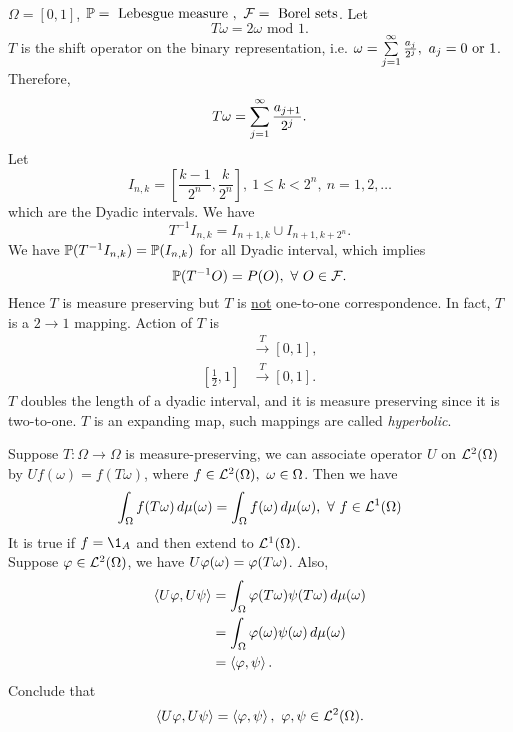 \begin{example}\ \\
$\Omega = [0,1]$, $\P = \text{ Lebesgue measure },\ \Fs = \text{ Borel sets}$. Let
\begin{equation*}
    T \omega = 2 \omega \text{ mod } 1.
\end{equation*}
$T$ is the shift operator on the binary representation, i.e. $\omega = \summ{j=1}\infty \frac{a_j}{2^j},\ a_j = 0 \text{ or } 1$. Therefore,
\begin{equation*}
    T \omega = \summ{j = 1}\infty \frac{a_{j + 1}}{2^j}.
\end{equation*}
Let
\begin{equation*}
    I_{n,k} = [\frac{k - 1}{2^n}, \frac{k}{2^n}],\ 1 \leq k < 2^n,\ n = 1,2,\dots
\end{equation*}
which are the Dyadic intervals. We have
\begin{equation*}
    T^{-1} I_{n,k} = I_{n+1,k} \cup I_{n+1, k+ 2^n}.
\end{equation*}
We have $\P(T^{-1} I_{n,k}) = \P(I_{n,k})$ for all Dyadic interval, which implies
\begin{equation*}
    \P(T^{-1} O) = P(O),\ \forall\ O \in \Fs.
\end{equation*}
Hence $T$ is measure preserving but $T$ is \underline{not} one-to-one correspondence. In fact, $T$ is a $2 \to 1$ mapping. Action of $T$ is
\begin{align*}
    [0,\frac{1}{2}] &\overset{T}{\to} [0,1],\\
    [\frac{1}{2},1] &\overset{T}{\to} [0,1].
\end{align*}
$T$ doubles the length of a dyadic interval, and it is measure preserving since it is two-to-one. $T$ is an expanding map, such mappings are called \textit{hyperbolic}.
\end{example}


\np Suppose $T: \Omega \to \Omega$ is measure-preserving, we can associate operator $U$ on $\Ls^2(\Omega)$ by $U f(\omega) = f(T \omega)$, where $f \in \Ls^2(\Omega),\ \omega \in \Omega$. Then we have
\begin{equation*}
    \int_\Omega f(T \omega) \dr \mu(\omega) = \int_\Omega f(\omega) \dr \mu(\omega),\ \forall\ f \in \Ls^1(\Omega)
\end{equation*}
It is true if $f = \1_A$ and then extend to $\Ls^1(\Omega)$.\\
Suppose $\vphi \in \Ls^2(\Omega)$, we have $U \vphi(\omega) = \vphi (T \omega)$. Also,
\begin{align*}
    \inprod{U \vphi}{U \psi} &= \int_\Omega \vphi(T \omega) \psi(T \omega) \dr \mu(\omega)\\
    &= \int_\Omega \vphi(\omega) \psi(\omega) \dr \mu(\omega)\\
    &= \inprod{\vphi}{\psi}.
\end{align*}
Conclude that
\begin{equation*}
    \inprod{U \vphi}{U \psi} = \inprod{\vphi}{\psi},\ \vphi,\psi \in \Ls^2(\Omega).
\end{equation*}

